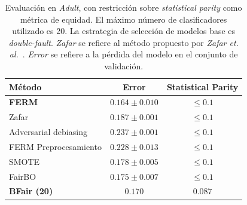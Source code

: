 \begin{table}[H]
    \centering

    \begin{tabular}{lcc}
    \toprule
        Método & Error & Statistical Parity \\
        \midrule \midrule
        \textbf{FERM} & $0.164 \pm 0.010$ & $\leq 0.1$ \\
        Zafar & $0.187 \pm 0.001$ & $\leq 0.1$ \\
        Adversarial debiasing & $0.237 \pm 0.001$ & $\leq 0.1$ \\ 
        \midrule
        FERM Preprocesamiento & $0.228 \pm 0.013$ & $\leq 0.1$ \\
        SMOTE & $0.178 \pm 0.005$ & $\leq 0.1$ \\
        FairBO & $0.175 \pm 0.007$ & $\leq 0.1$ \\  
        \midrule
        \textbf{BFair (20)} & $0.170$ & $0.087$ \\
    \bottomrule
    \end{tabular}

    \caption{
    Evaluación en \emph{Adult}, con restricción sobre \emph{statistical parity} como métrica de equidad.
    El máximo número de clasificadores utilizado es 20.
    La estrategia de selección de modelos base es \emph{double-fault}.
    \emph{Zafar} se refiere al método propuesto por \emph{Zafar et. al.}~\parencite{zafar2017fairness}.
    \emph{Error} se refiere a la pérdida del modelo en el conjunto de validación.}
    
    \label{table:second-phase-vs-all}
\end{table}

